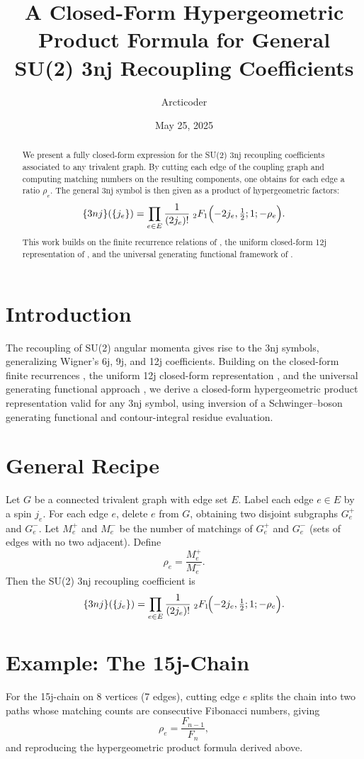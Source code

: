 \documentclass{article}
\title{A Closed-Form Hypergeometric Product Formula for General SU(2) 3nj Recoupling Coefficients}
\author{Arcticoder}
\date{May 25, 2025}
\begin{document}
\maketitle

\begin{abstract}
We present a fully closed-form expression for the SU(2) 3nj recoupling coefficients associated to any trivalent graph. By cutting each edge of the coupling graph and computing matching numbers on the resulting components, one obtains for each edge a ratio $\rho_e$. The general 3nj symbol is then given as a product of hypergeometric factors:
\[
\{3nj\}(\{j_e\})
=\prod_{e\in E}\frac{1}{(2j_e)!}\;
{}_2F_1\Bigl(-2j_e,\tfrac12;1;-\rho_e\Bigr).
\]
This work builds on the finite recurrence relations of \cite{finiteRec}, the uniform closed-form 12j representation of \cite{uniform12j}, and the universal generating functional framework of \cite{universalGF}.
\end{abstract}

\section{Introduction}
The recoupling of SU(2) angular momenta gives rise to the 3nj symbols, generalizing Wigner’s 6j, 9j, and 12j coefficients.  
Building on the closed-form finite recurrences \cite{finiteRec}, the uniform 12j closed-form representation \cite{uniform12j}, and the universal generating functional approach \cite{universalGF}, we derive a closed-form hypergeometric product representation valid for any 3nj symbol, using inversion of a Schwinger--boson generating functional and contour-integral residue evaluation.

\section{General Recipe}
Let $G$ be a connected trivalent graph with edge set $E$.  Label each edge $e\in E$ by a spin $j_e$.  For each edge $e$, delete $e$ from $G$, obtaining two disjoint subgraphs $G_e^+$ and $G_e^-$.  Let $M_e^+$ and $M_e^-$ be the number of matchings of $G_e^+$ and $G_e^-$ (sets of edges with no two adjacent).  Define
\[
\rho_e = \frac{M_e^+}{M_e^-}.
\]
Then the SU(2) 3nj recoupling coefficient is
\[
\{3nj\}(\{j_e\})
=\prod_{e\in E}
\frac{1}{(2j_e)!}\;
{}_2F_1\!\Bigl(-2j_e,\tfrac12;1;-\rho_e\Bigr).
\]

\section{Example: The 15j-Chain}
For the 15j-chain on 8 vertices (7 edges), cutting edge $e$ splits the chain into two paths whose matching counts are consecutive Fibonacci numbers, giving
\[
\rho_e = \frac{F_{n-1}}{F_n},
\]
and reproducing the hypergeometric product formula derived above.
\end{document}
